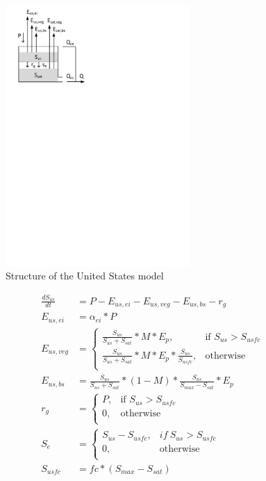 { 																	%
\begin{figure}
\includegraphics[trim=1cm 21cm 9cm 1cm,width=7cm,keepaspectratio]{./files/08_schematic.pdf}
\caption{Structure of the United States model} \label{fig:08_schematic}
\end{figure}

\begin{align}
	\frac{dS_{us}}{dt} &= P - E_{us,ei}-E_{us,veg}-E_{us,bs}-r_g \\
	E_{us,ei} &= \alpha_{ei}*P\\
	E_{us,veg} &= \begin{cases}
		\frac{S_{us}}{S_{us}+S_{sat}}*M*E_p, &\text{if } S_{us} > S_{usfc} \\
		\frac{S_{us}}{S_{us}+S_{sat}}*M*E_p*\frac{S_{us}}{S_{usfc}}, & \text{otherwise} \\
	\end{cases} \\
	E_{us,bs} &= \frac{S_{us}}{S_{us}+S_{sat}}*(1-M)*\frac{S_{us}}{S_{max}-S_{sat}}*E_p\\
	r_g &=\begin{cases}
		P, &\text{if } S_{us} > S_{usfc}\\
		0, & \text{otherwise} \\
	\end{cases}\\
	S_e &= \begin{cases}
			S_{us} - S_{usfc}, & if~S_{us} > S_{usfc}\\
			0, & \text{otherwise} \\
			\end{cases}\\
	S_{usfc} &= fc*(S_{max} - S_{sat})
\end{align}
} %

